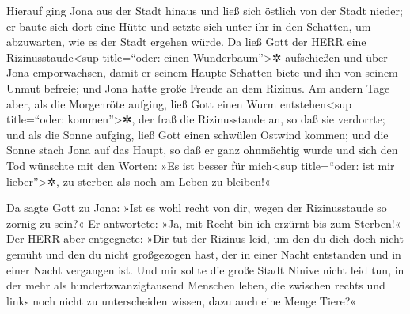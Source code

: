 Hierauf ging Jona aus der Stadt hinaus und ließ sich
östlich von der Stadt nieder; er baute sich dort eine Hütte und setzte
sich unter ihr in den Schatten, um abzuwarten, wie es der Stadt ergehen
würde. Da ließ Gott der HERR eine
Rizinusstaude\textless sup title=``oder: einen Wunderbaum''\textgreater✲
aufschießen und über Jona emporwachsen, damit er seinem Haupte Schatten
biete und ihn von seinem Unmut befreie; und Jona hatte große Freude an
dem Rizinus. Am andern Tage aber, als die Morgenröte
aufging, ließ Gott einen Wurm entstehen\textless sup title=``oder:
kommen''\textgreater✲, der fraß die Rizinusstaude an, so daß sie
verdorrte; und als die Sonne aufging, ließ Gott einen
schwülen Ostwind kommen; und die Sonne stach Jona auf das Haupt, so daß
er ganz ohnmächtig wurde und sich den Tod wünschte mit den Worten: »Es
ist besser für mich\textless sup title=``oder: ist mir
lieber''\textgreater✲, zu sterben als noch am Leben zu bleiben!«

Da sagte Gott zu Jona: »Ist es wohl recht von dir, wegen
der Rizinusstaude so zornig zu sein?« Er antwortete: »Ja, mit Recht bin
ich erzürnt bis zum Sterben!« Der HERR aber entgegnete:
»Dir tut der Rizinus leid, um den du dich doch nicht gemüht und den du
nicht großgezogen hast, der in einer Nacht entstanden und in einer Nacht
vergangen ist. Und mir sollte die große Stadt Ninive
nicht leid tun, in der mehr als hundertzwanzigtausend Menschen leben,
die zwischen rechts und links noch nicht zu unterscheiden wissen, dazu
auch eine Menge Tiere?«

